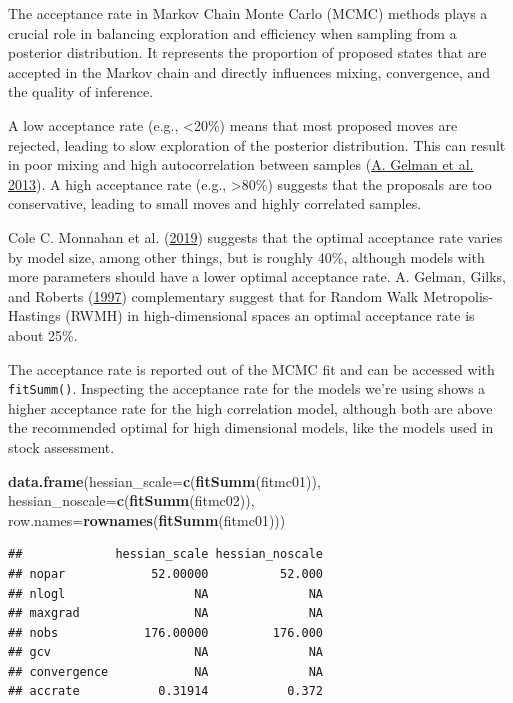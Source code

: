 \documentclass[
]{book}
\newenvironment{Shaded}{\begin{snugshade}}{\end{snugshade}}
\newcommand{\AttributeTok}[1]{\textcolor[rgb]{0.13,0.29,0.53}{#1}}
\newcommand{\FunctionTok}[1]{\textcolor[rgb]{0.13,0.29,0.53}{\textbf{#1}}}
\newcommand{\NormalTok}[1]{#1}
\begin{document}
The acceptance rate in Markov Chain Monte Carlo (MCMC) methods plays a crucial role in balancing exploration and efficiency when sampling from a posterior distribution. It represents the proportion of proposed states that are accepted in the Markov chain and directly influences mixing, convergence, and the quality of inference.

A low acceptance rate (e.g., \textless20\%) means that most proposed moves are rejected, leading to slow exploration of the posterior distribution. This can result in poor mixing and high autocorrelation between samples (\protect\hyperlink{ref-gelman2013bayesian}{A. Gelman et al. 2013}). A high acceptance rate (e.g., \textgreater80\%) suggests that the proposals are too conservative, leading to small moves and highly correlated samples.

Cole C. Monnahan et al. (\protect\hyperlink{ref-monnahan2019}{2019}) suggests that the optimal acceptance rate varies by model size, among other things, but is roughly 40\%, although models with more parameters should have a lower optimal acceptance rate. A. Gelman, Gilks, and Roberts (\protect\hyperlink{ref-gelman97}{1997}) complementary suggest that for Random Walk Metropolis-Hastings (RWMH) in high-dimensional spaces an optimal acceptance rate is about 25\%.

The acceptance rate is reported out of the MCMC fit and can be accessed with \texttt{fitSumm()}. Inspecting the acceptance rate for the models we're using shows a higher acceptance rate for the high correlation model, although both are above the recommended optimal for high dimensional models, like the models used in stock assessment.

\begin{Shaded}
\begin{Highlighting}[]
\FunctionTok{data.frame}\NormalTok{(}\AttributeTok{hessian\_scale=}\FunctionTok{c}\NormalTok{(}\FunctionTok{fitSumm}\NormalTok{(fitmc01)),}
    \AttributeTok{hessian\_noscale=}\FunctionTok{c}\NormalTok{(}\FunctionTok{fitSumm}\NormalTok{(fitmc02)),}
    \AttributeTok{row.names=}\FunctionTok{rownames}\NormalTok{(}\FunctionTok{fitSumm}\NormalTok{(fitmc01)))}
\end{Highlighting}
\end{Shaded}

\begin{verbatim}
##             hessian_scale hessian_noscale
## nopar            52.00000          52.000
## nlogl                  NA              NA
## maxgrad                NA              NA
## nobs            176.00000         176.000
## gcv                    NA              NA
## convergence            NA              NA
## accrate           0.31914           0.372
\end{verbatim}
\end{document}
